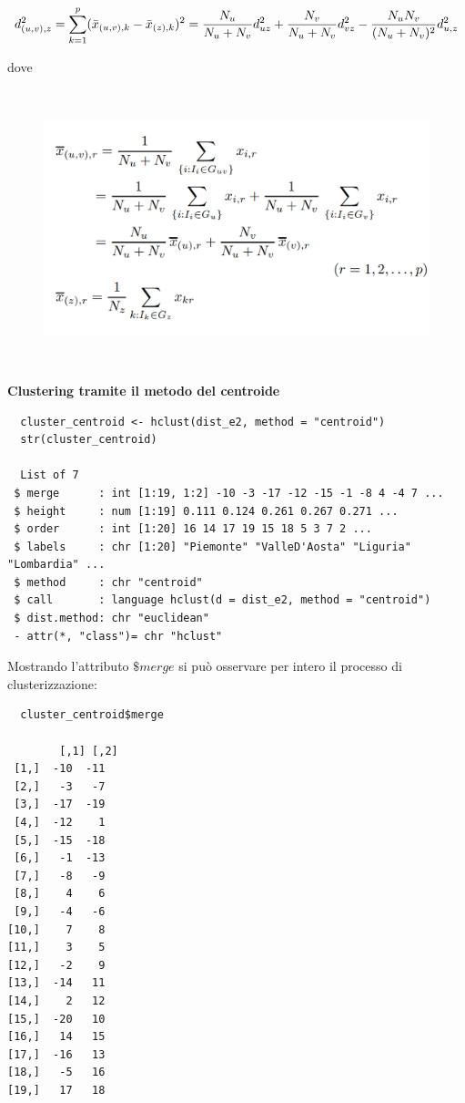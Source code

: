 \[d_{(u, v), z}^2 = \sum_{k=1}^p(\Bar{x}_{(u, v), k} - \Bar{x}_{(z), k})^2 = \frac{N_u}{N_u + N_v} d_{uz}^2 + \frac{N_v}{N_u + N_v} d_{vz}^2 - \frac{N_uN_v}{(N_u + N_v)^2} d_{u,z}^2\]

dove 

\vspace{5mm}
\begin{figure}[!htbp]
    \centering
    \includegraphics[height=8cm]{ProgettoSAD/capitoli/images/clustering/xuxz.png}
\end{figure}
\vspace{5mm}

\noindent \textbf{Clustering tramite il metodo del centroide}

\vspace{5mm}
\begin{lstlisting}
  cluster_centroid <- hclust(dist_e2, method = "centroid")
  str(cluster_centroid)

  List of 7
 $ merge      : int [1:19, 1:2] -10 -3 -17 -12 -15 -1 -8 4 -4 7 ...
 $ height     : num [1:19] 0.111 0.124 0.261 0.267 0.271 ...
 $ order      : int [1:20] 16 14 17 19 15 18 5 3 7 2 ...
 $ labels     : chr [1:20] "Piemonte" "ValleD'Aosta" "Liguria" "Lombardia" ...
 $ method     : chr "centroid"
 $ call       : language hclust(d = dist_e2, method = "centroid")
 $ dist.method: chr "euclidean"
 - attr(*, "class")= chr "hclust"
\end{lstlisting}
\vspace{5mm}

Mostrando l'attributo $\$merge$ si può osservare per intero il processo di clusterizzazione:

\vspace{5mm}
\begin{lstlisting}
  cluster_centroid$merge

        [,1] [,2]
 [1,]  -10  -11
 [2,]   -3   -7
 [3,]  -17  -19
 [4,]  -12    1
 [5,]  -15  -18
 [6,]   -1  -13
 [7,]   -8   -9
 [8,]    4    6
 [9,]   -4   -6
[10,]    7    8
[11,]    3    5
[12,]   -2    9
[13,]  -14   11
[14,]    2   12
[15,]  -20   10
[16,]   14   15
[17,]  -16   13
[18,]   -5   16
[19,]   17   18
\end{lstlisting}
\vspace{5mm}

